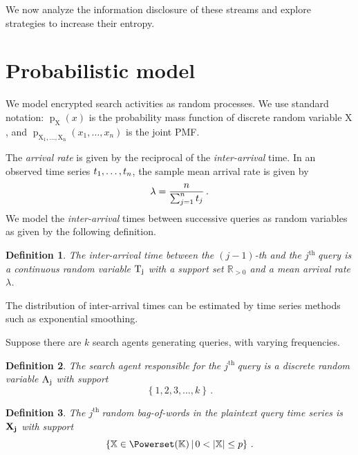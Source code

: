\documentclass[final,11pt]{article}
\newcommand{\qb}[1][]{%
   \ifthenelse{ \equal{#1}{} }
      {\ensuremath{\vec{x}}}
      {\ensuremath{\vec{x_{#1}}}}
}
\newcommand{\rvqb}[1][]{%
   \ifthenelse{ \equal{#1}{} }
      {\ensuremath{\rv{\vec{X}}}}
      {\ensuremath{\rv{\vec{X_{#1}}}}}
}
\newcommand{\ts}[1][]{%
   \ifthenelse{ \equal{#1}{} }
      {\ensuremath{t}}
      {\ensuremath{t_{#1}}}
}
\newcommand{\rvts}[1][]{%
   \ifthenelse{ \equal{#1}{} }
      {\ensuremath{\rv{T}}}
      {\ensuremath{\rv{T_{#1}}}}
}
\newcommand{\rvsa}[1][]{%
   \ifthenelse{ \equal{#1}{} }
      {\ensuremath{\rv{A}}}
      {\ensuremath{\rv{A_{#1}}}}
}
\newcommand{\rv}[1]{\mathrm{#1}}
\newcommand{\pmf}{\operatorname{p}}
\newcommand{\jth}{$j^{\text{th }}$}
\newcommand{\card}[1]{\left\vert{#1}\right\vert}
\newcommand{\given}{{\,|\,}}
\renewcommand{\vec}[1]{\boldsymbol{\mathbf{#1}}}
\DeclareMathOperator{\expectation}{\mathbb{E}}
\numberwithin{equation}{section}
\theoremstyle{plain}
\newtheorem{definition}{Definition}[section]
\theoremstyle{remark}
\begin{document}
We now analyze the information disclosure of these streams and explore strategies to increase their entropy.
\section{Probabilistic model}
\label{sec:probabilistic}
We model encrypted search activities as random processes. We use standard notation: $\pmf_{\rv{X}}(x)$ is the probability mass function of discrete random variable $\rv{X}$, and $\pmf_{\rv{X_1}, \ldots, \rv{X_n}}(x_1, \ldots, x_n)$ is the joint PMF.

The \emph{arrival rate} is given by the reciprocal of the \emph{inter-arrival} time. In an observed time series $\ts[1],\ldots,\ts[n]$, the sample mean arrival rate is given by
\begin{equation}
    \lambda = \frac{n}{\sum_{j=1}^{n} \ts[j]}\,.
\end{equation}
We model the \emph{inter-arrival} times between successive queries as random variables as given by the following definition.
\begin{definition}
The \emph{inter-arrival} time between the $(j-1)$-th and the \jth query is a continuous random variable $\rvts[j]$ with a support set $\mathbb{R}_{>0}$ and a mean arrival rate $\lambda$.
\end{definition}

The distribution of inter-arrival times can be estimated by time series methods such as exponential smoothing.

Suppose there are $k$ search agents generating queries, with varying frequencies.
\begin{definition}
The search agent responsible for the \jth query is a discrete random variable $\rvsa[j]$ with support
\begin{equation}
    \left\{1,2,3,\ldots,k\right\}\,.
\end{equation}
\end{definition}

\begin{definition}
The \jth random bag-of-words in the plaintext query time series is $\rvqb[j]$ with support
\begin{equation}
    \left\{
        \mathbb{X} \in \Powerset(\mathbb{K}) \given 0 < \card{\mathbb{X}} \leq p
    \right\}\,.
\end{equation}
\end{definition}

\end{document}
